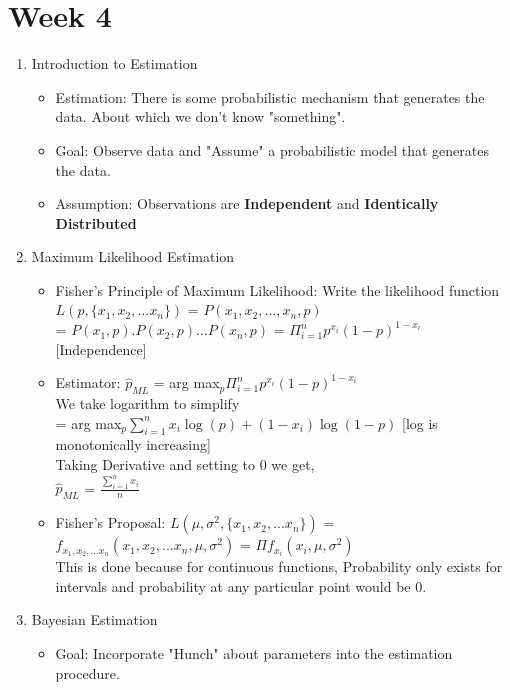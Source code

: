 \documentclass[a4paper]{article}
\begin{document}
\section{Week 4}
\begin{enumerate}
    \item Introduction to Estimation
    \begin{itemize}
        \item Estimation: There is some probabilistic mechanism that generates the data. About which we don't know "something".
        \item Goal: Observe data and "Assume" a probabilistic model that generates the data.
        \item Assumption: Observations are \textbf{Independent} and \textbf{Identically Distributed}
    \end{itemize}
    \item Maximum Likelihood Estimation
    \begin{itemize}
        \item Fisher's Principle of Maximum Likelihood: Write the likelihood function \\
        $L(p, \{x_1,x_2,...x_n\})$ = $P(x_1,x_2,...,x_n,p)$\\
        = $P(x_1,p).P(x_2,p)...P(x_n,p)$ = $\Pi_{i=1}^np^{x_i}(1-p)^{1-x_i}$ [Independence]
        \item Estimator: $\hat{p}_{ML}$ = arg max$_p\Pi_{i=1}^np^{x_i}(1-p)^{1-x_i}$\\
        We take logarithm to simplify\\
        = arg max$_p\sum_{i=1}^nx_i\log(p)+(1-x_i)\log(1-p)$ [log is monotonically increasing]\\
        Taking Derivative and setting to 0 we get,\\
        $\hat{p}_{ML}$ = $\frac{\sum_{i=1}^nx_i}{n}$
        \item Fisher's Proposal: $L(\mu, \sigma^2, \{x_1,x_2,...x_n\})$ = $f_{x_1,x_2,...x_n}(x_1,x_2,...x_n,\mu,\sigma^2)$ = $\Pi f_{x_i}(x_i,\mu,\sigma^2)$\\
        This is done because for continuous functions, Probability only exists for intervals and probability at any particular point would be 0.
    \end{itemize}
    \item Bayesian Estimation
    \begin{itemize}
        \item Goal: Incorporate "Hunch" about parameters into the estimation procedure.

\end{itemize}
\end{enumerate}
\end{document}
